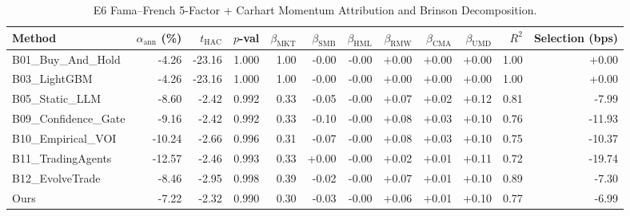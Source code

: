 \begin{table}[t]
\centering
\caption{E6 Fama--French 5-Factor + Carhart Momentum Attribution and Brinson Decomposition.}
\label{tab:e6_factor_attribution}
\footnotesize
\setlength{\tabcolsep}{3.5pt}
\begin{tabular}{lrrrrrrrrrrr}
\toprule
Method & $\alpha_{\text{ann}}$ (\%) & $t_{\text{HAC}}$ & $p$-val & $\beta_{\text{MKT}}$ & $\beta_{\text{SMB}}$ & $\beta_{\text{HML}}$ & $\beta_{\text{RMW}}$ & $\beta_{\text{CMA}}$ & $\beta_{\text{UMD}}$ & $R^2$ & Selection (bps) \\
\midrule
B01\_Buy\_And\_Hold & -4.26 & -23.16 & 1.000 & 1.00 & -0.00 & -0.00 & +0.00 & +0.00 & +0.00 & 1.00 & +0.00 \\
B03\_LightGBM & -4.26 & -23.16 & 1.000 & 1.00 & -0.00 & -0.00 & +0.00 & +0.00 & +0.00 & 1.00 & +0.00 \\
B05\_Static\_LLM & -8.60 & -2.42 & 0.992 & 0.33 & -0.05 & -0.00 & +0.07 & +0.02 & +0.12 & 0.81 & -7.99 \\
B09\_Confidence\_Gate & -9.16 & -2.42 & 0.992 & 0.33 & -0.10 & -0.00 & +0.08 & +0.03 & +0.10 & 0.76 & -11.93 \\
B10\_Empirical\_VOI & -10.24 & -2.66 & 0.996 & 0.31 & -0.07 & -0.00 & +0.08 & +0.03 & +0.10 & 0.75 & -10.37 \\
B11\_TradingAgents & -12.57 & -2.46 & 0.993 & 0.33 & +0.00 & -0.00 & +0.02 & +0.01 & +0.11 & 0.72 & -19.74 \\
B12\_EvolveTrade & -8.46 & -2.95 & 0.998 & 0.39 & -0.02 & -0.00 & +0.07 & +0.01 & +0.10 & 0.89 & -7.30 \\
Ours & -7.22 & -2.32 & 0.990 & 0.30 & -0.03 & -0.00 & +0.06 & +0.01 & +0.10 & 0.77 & -6.99 \\
\bottomrule
\end{tabular}
\end{table}
